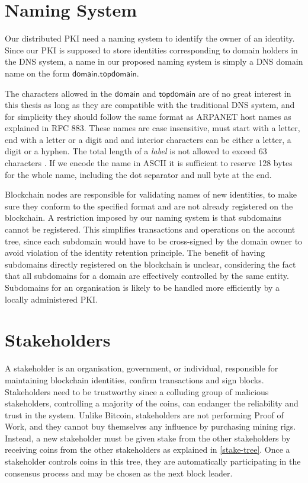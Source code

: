 \documentclass{style/kththesis}
\begin{document}
\section{Naming System}
\label{naming-system}
Our distributed PKI need a naming system to identify the owner of an identity. Since our PKI is supposed to store identities corresponding to domain holders in the DNS system, a name in our proposed naming system is simply a DNS domain name on the form $\mathsf{domain.topdomain}$.

The characters allowed in the $\mathsf{domain}$ and $\mathsf{topdomain}$ are of no great interest in this thesis as long as they are compatible with the traditional DNS system, and for simplicity they should follow the same format as ARPANET host names as explained in RFC 883. These names are case insensitive, must start with a letter, end with a letter or a digit and and interior characters can be either a letter, a digit or a hyphen. The total length of a \emph{label} is not allowed to exceed 63 characters \cite{RFC0883}. If we encode the name in ASCII it is sufficient to reserve 128 bytes for the whole name, including the dot separator and null byte at the end.

Blockchain nodes are responsible for validating names of new identities, to make sure they conform to the specified format and are not already registered on the blockchain. A restriction imposed by our naming system is that subdomains cannot be registered. This simplifies transactions and operations on the account tree, since each subdomain would have to be cross-signed by the domain owner to avoid violation of the identity retention principle. The benefit of having subdomains directly registered on the blockchain is unclear, considering the fact that all subdomains for a domain are effectively controlled by the same entity. Subdomains for an organisation is likely to be handled more efficiently by a locally administered PKI.

\section{Stakeholders}
A stakeholder is an organisation, government, or individual, responsible for maintaining blockchain identities, confirm transactions and sign blocks. Stakeholders need to be trustworthy since a colluding group of malicious stakeholders, controlling a majority of the coins, can endanger the reliability and trust in the system. Unlike Bitcoin, stakeholders are not performing Proof of Work, and they cannot buy themselves any influence by purchasing mining rigs. Instead, a new stakeholder must be given stake from the other stakeholders by receiving coins from the other stakeholders as explained in \cref{stake-tree}. Once a stakeholder controls coins in this tree, they are automatically participating in the consensus process and may be chosen as the next block leader.
\end{document}
